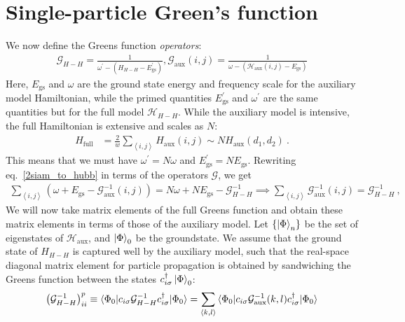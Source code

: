 \documentclass[10pt]{report}
\numberwithin{equation}{section}
\begin{document}
\section{Single-particle Green's function}
We now define the Greens function {\it operators}:
\begin{equation}\begin{aligned}
	\mathcal{G}_{H-H} = \frac{1}{\omega^\prime - \left(H_{H-H} - E_\text{gs}^\prime\right) }, \mathcal{G}_\text{aux}(i,j) = \frac{1}{\omega - \left(\mathcal{H}_\text{aux}(i,j) - E_\text{gs}\right)}
\end{aligned}\end{equation}
Here, \(E_\text{gs}\) and \(\omega\) are the ground state energy and frequency scale for the auxiliary model Hamiltonian, while the primed quantities \(E_\text{gs}^\prime\) and \(\omega^\prime\) are the same quantities but for the full model \(\mathcal{H}_{H-H}\). While the auxiliary model is intensive, the full Hamiltonian is extensive and scales as \(N\):
\begin{equation}\begin{aligned}
	H_\text{full} &= \frac{2}{w}\sum_{\left<i,j\right>} H_\text{aux}(i,j) \sim N H_\text{aux}(d_1,d_2)~.
\end{aligned}\end{equation}
This means that we must have \(\omega^\prime = N\omega\) and \(E_\text{gs}^\prime = N E_\text{gs}\).
Rewriting eq.~\ref{2siam_to_hubb} in terms of the operators \(\mathcal{G}\), we get
\begin{equation}\begin{aligned}
\sum_{\left<i,j \right>} \left(\omega + E_\text{gs} - \mathcal{G}^{-1}_\text{aux}(i,j)\right) = N\omega + N E_\text{gs} - \mathcal{G}^{-1}_{H-H} \implies \sum_{\left<i,j \right>} \mathcal{G}^{-1}_\text{aux}(i,j) = \mathcal{G}^{-1}_{H-H}~,
\end{aligned}\end{equation}
We will now take matrix elements of the full Greens function and obtain these matrix elements in terms of those of the auxiliary model. Let \(\left\{ \ket{\Phi}_n \right\} \) be the set of eigenstates of \(\mathcal{H}_\text{aux}\), and \(\ket{\Phi}_0\) be the groundstate. We assume that the ground state of \(H_{H-H}\) is captured well by the auxiliary model, such that the real-space diagonal matrix element for particle propagation is obtained by sandwiching the Greens function between the states \(c^\dagger_{i\sigma}\ket{\Phi}_0\):
\begin{equation}\begin{aligned}
	\left(\mathcal{G}^{-1}_{H-H}\right)^p_{ii} \equiv \braket{\Phi_0 | c_{i\sigma} \mathcal{G}^{-1}_{H-H} c^\dagger_{i\sigma} | \Phi_0} = \sum_{\left<k,l\right>} \braket{\Phi_0 | c_{i\sigma} \mathcal{G}^{-1}_\text{aux}(k,l) c^\dagger_{i\sigma} | \Phi_0}
\end{aligned}\end{equation}
\end{document}
